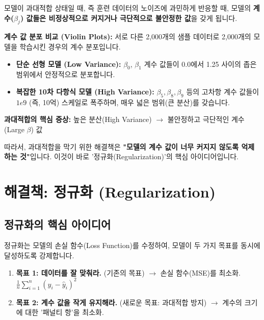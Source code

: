 \documentclass[11pt,a4paper]{book}
\theoremstyle{definition}
\begin{document}
모델이 과대적합 상태일 때, 즉 훈련 데이터의 노이즈에 과민하게 반응할 때, 모델의 \textbf{계수($\beta_j$) 값들은 비정상적으로 커지거나 극단적으로 불안정한 값}을 갖게 됩니다.

\begin{examplebox}
\textbf{계수 값 분포 비교 (Violin Plots):}
서로 다른 2,000개의 샘플 데이터로 2,000개의 모델을 학습시킨 경우의 계수 분포입니다.

\begin{itemize}
    \item \textbf{단순 선형 모델 (Low Variance):}
        $\beta_0$, $\beta_1$ 계수 값들이 0.0에서 1.25 사이의 좁은 범위에서 안정적으로 분포합니다.
    \item \textbf{복잡한 10차 다항식 모델 (High Variance):}
        $\beta_5, \beta_8, \beta_9$ 등의 고차항 계수 값들이 $1e9$ (즉, 10억) 스케일로 폭주하며, 매우 넓은 범위(큰 분산)를 갖습니다.
\end{itemize}
\end{examplebox}

\begin{warningbox}
\textbf{과대적합의 핵심 증상:}
높은 분산(High Variance) $\rightarrow$ 불안정하고 극단적인 계수(Large $\beta$) 값

따라서, 과대적합을 막기 위한 해결책은 \textbf{"모델의 계수 값이 너무 커지지 않도록 억제하는 것"}입니다.
이것이 바로 '정규화(Regularization)'의 핵심 아이디어입니다.
\end{warningbox}


\section{해결책: 정규화 (Regularization)}

\subsection{정규화의 핵심 아이디어}

정규화는 모델의 손실 함수(Loss Function)를 수정하여, 모델이 두 가지 목표를 동시에 달성하도록 강제합니다.

\begin{enumerate}
    \item \textbf{목표 1: 데이터를 잘 맞춰라.} (기존의 목표)
        $\rightarrow$ 손실 함수(MSE)를 최소화. $\frac{1}{n}\sum_{i=1}^{n}(y_i - \hat{y}_i)^2$
    \item \textbf{목표 2: 계수 값을 작게 유지해라.} (새로운 목표: 과대적합 방지)
        $\rightarrow$ 계수의 크기에 대한 '패널티 항'을 최소화.
\end{enumerate}
\end{document}
